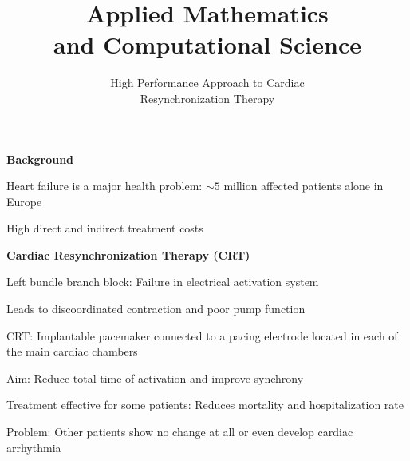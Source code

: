 \documentclass[12pt]{ICSPoster}
\title{Applied Mathematics\\[0.2cm]and Computational Science}
\subtitle{High Performance Approach to Cardiac\\ Resynchronization Therapy}
\begin{document}
  \maketitle




 \begin{posterbox}
    \begin{headerbox}[
        title=Background: Understanding Cardiac Resynchronization Therapy,
        height=0.19\textheight]
      \begin{minipage}{\textwidth}\sf
        \textbf{Background}
        \vspace{1mm}
        \begin{compactitem}
          \item Heart failure is a major health problem: $\sim 5$ million affected patients alone in Europe
          \item High direct and indirect treatment costs
        \end{compactitem}
      \end{minipage}

      \vspace{0.5cm}

      \begin{minipage}{0.55\textwidth}\sf
        \textbf{Cardiac Resynchronization Therapy (CRT)}
        \begin{compactitem}
          \item Left bundle branch block: Failure in electrical activation system
          \item Leads to discoordinated contraction and poor pump function
          \item CRT: Implantable pacemaker connected to a pacing electrode
                located in each of the main cardiac chambers
          \item Aim: Reduce total time of activation and improve synchrony
          \item Treatment effective for some patients: Reduces mortality and hospitalization rate
          \item Problem: Other patients show no change at all or even develop cardiac arrhythmia
        \end{compactitem}

        \vspace{0.5cm}


\end{minipage}
\end{headerbox}
\end{posterbox}
\end{document}

